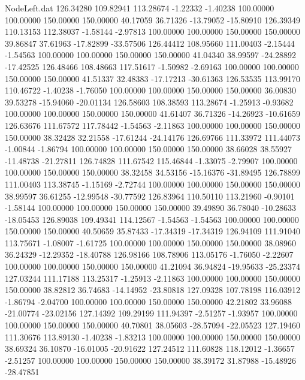 \begin{filecontents}{NodeLeft.dat}
 126.34280  109.82941  113.28674    -1.22332   -1.40238  100.00000  100.00000  150.00000  150.00000   40.17059   36.71326  -13.79052  -15.80910
 126.39349  110.13153  112.38037    -1.58144   -2.97813  100.00000  100.00000  150.00000  150.00000   39.86847   37.61963  -17.82899  -33.57506
 126.44412  108.95660  111.00403    -2.15444   -1.54563  100.00000  100.00000  150.00000  150.00000   41.04340   38.99597  -24.28892  -17.42525
 126.48466  108.48663  117.51617    -1.50982   -2.69163  100.00000  100.00000  150.00000  150.00000   41.51337   32.48383  -17.17213  -30.61363
 126.53535  113.99170  110.46722    -1.40238   -1.76050  100.00000  100.00000  150.00000  150.00000   36.00830   39.53278  -15.94060  -20.01134
 126.58603  108.38593  113.28674    -1.25913   -0.93682  100.00000  100.00000  150.00000  150.00000   41.61407   36.71326  -14.26923  -10.61659
 126.63676  111.67572  117.78442    -1.54563   -2.11863  100.00000  100.00000  150.00000  150.00000   38.32428   32.21558  -17.61244  -24.14176
 126.69766  111.33972  111.44073    -1.00844   -1.86794  100.00000  100.00000  150.00000  150.00000   38.66028   38.55927  -11.48738  -21.27811
 126.74828  111.67542  115.46844    -1.33075   -2.79907  100.00000  100.00000  150.00000  150.00000   38.32458   34.53156  -15.16376  -31.89495
 126.78899  111.00403  113.38745    -1.15169   -2.72744  100.00000  100.00000  150.00000  150.00000   38.99597   36.61255  -12.99548  -30.77592
 126.83964  110.50110  113.21960    -0.90101   -1.58144  100.00000  100.00000  150.00000  150.00000   39.49890   36.78040  -10.28633  -18.05453
 126.89038  109.49341  114.12567    -1.54563   -1.54563  100.00000  100.00000  150.00000  150.00000   40.50659   35.87433  -17.34319  -17.34319
 126.94109  111.91040  113.75671    -1.08007   -1.61725  100.00000  100.00000  150.00000  150.00000   38.08960   36.24329  -12.29352  -18.40788
 126.98166  108.78906  113.05176    -1.76050   -2.22607  100.00000  100.00000  150.00000  150.00000   41.21094   36.94824  -19.95633  -25.23374
 127.03244  111.17188  113.25317    -1.25913   -2.11863  100.00000  100.00000  150.00000  150.00000   38.82812   36.74683  -14.14952  -23.80818
 127.09328  107.78198  116.03912    -1.86794   -2.04700  100.00000  100.00000  150.00000  150.00000   42.21802   33.96088  -21.00774  -23.02156
 127.14392  109.29199  111.94397    -2.51257   -1.93957  100.00000  100.00000  150.00000  150.00000   40.70801   38.05603  -28.57094  -22.05523
 127.19460  111.30676  113.89130    -1.40238   -1.83213  100.00000  100.00000  150.00000  150.00000   38.69324   36.10870  -16.01005  -20.91622
 127.24512  111.60828  118.12012    -1.36657   -2.51257  100.00000  100.00000  150.00000  150.00000   38.39172   31.87988  -15.48926  -28.47851

\end{filecontents}
